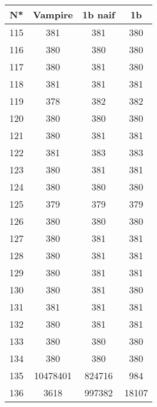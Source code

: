 \begin{table}[H]
\begin{tabular}{|c|c|c|c|}
\hline
N* & Vampire & 1b naif & 1b \\
\hline
115 & 381 & 381 & 380 \\
\hline
116 & 380 & 380 & 380 \\
\hline
117 & 380 & 381 & 380 \\
\hline
118 & 381 & 381 & 381 \\
\hline
119 & 378 & 382 & 382 \\
\hline
120 & 380 & 380 & 380 \\
\hline
121 & 380 & 381 & 381 \\
\hline
122 & 381 & 383 & 383 \\
\hline
123 & 380 & 381 & 381 \\
\hline
124 & 380 & 380 & 380 \\
\hline
125 & 379 & 379 & 379 \\
\hline
126 & 380 & 380 & 380 \\
\hline
127 & 380 & 381 & 381 \\
\hline
128 & 380 & 381 & 381 \\
\hline
129 & 380 & 381 & 381 \\
\hline
130 & 380 & 381 & 380 \\
\hline
131 & 381 & 381 & 381 \\
\hline
132 & 380 & 381 & 381 \\
\hline
133 & 380 & 380 & 380 \\
\hline
134 & 380 & 380 & 380 \\
\hline
135 & 10478401 & 824716 & 984 \\
\hline
136 & 3618 & 997382 & 18107 \\
\hline
\end{tabular}
\end{table}
